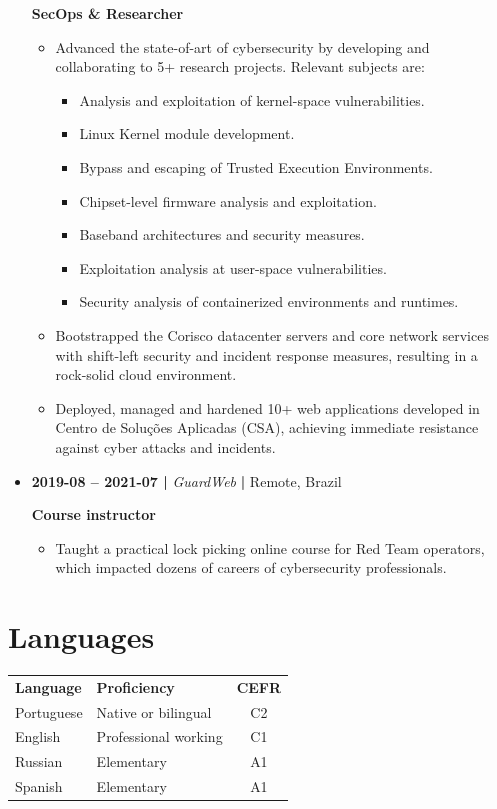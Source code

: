 \documentclass[a4paper,10pt]{article}
\begin{document}
\begin{multicols*}{2}
\begin{itemize}
\textbf{SecOps \& Researcher}
\begin{itemize}
\item Advanced the state-of-art of cybersecurity by developing and collaborating
to 5+ research projects. Relevant subjects are:
\begin{itemize}
\item Analysis and exploitation of kernel-space vulnerabilities.

\item Linux Kernel module development.

\item Bypass and escaping of Trusted Execution Environments.

\item Chipset-level firmware analysis and exploitation.

\item Baseband architectures and security measures.

\item Exploitation analysis at user-space vulnerabilities.

\item Security analysis of containerized environments and runtimes.
\end{itemize}

\item Bootstrapped the Corisco datacenter servers and core network services with
shift-left security and incident response measures, resulting in a
rock-solid cloud environment.

\item Deployed, managed and hardened 10+ web applications developed in Centro de
Soluções Aplicadas (CSA), achieving immediate resistance against cyber
attacks and incidents.
\end{itemize}

\item \textbf{2019-08 -- 2021-07 |} \emph{GuardWeb} \textbf{|} Remote, Brazil

\textbf{Course instructor}
\begin{itemize}
\item Taught a practical lock picking online course for Red Team operators, which
impacted dozens of careers of cybersecurity professionals.
\end{itemize}
\end{itemize}
\section*{Languages}
\label{sec:org994bd69}
\begin{center}
\begin{tabular}{l|l|c}
\textbf{Language} & \textbf{Proficiency} & \textbf{CEFR}\\
Portuguese & Native or bilingual & C2\\
English & Professional working & C1\\
Russian & Elementary & A1\\
Spanish & Elementary & A1\\
\end{tabular}
\end{center}

\end{multicols*}
\end{document}
